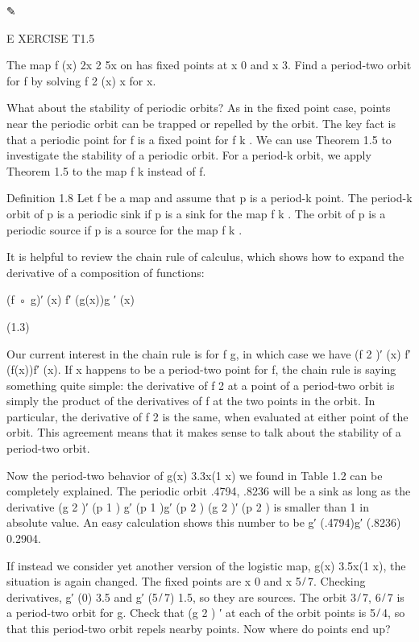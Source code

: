✎

E XERCISE T1.5

The map f (x)  2x 2  5x on has ﬁxed points at x  0 and x  3. Find a period-two orbit for f by solving f 2 
(x)  x for x.

What about the stability of periodic orbits? As in the ﬁxed point case, points near the periodic orbit can 
be trapped or repelled by the orbit. The key fact is that a periodic point for f is a ﬁxed point for f k . 
We can use Theorem 1.5 to investigate the stability of a periodic orbit. For a period-k orbit, we apply 
Theorem 1.5 to the map f k instead of f.


Deﬁnition 1.8 Let f be a map and assume that p is a period-k point. The period-k orbit of p is a periodic 
sink if p is a sink for the map f k . The orbit of p is a periodic source if p is a source for the map f k 
.

It is helpful to review the chain rule of calculus, which shows how to expand the derivative of a 
composition of functions:

(f ◦ g)′ (x)  f′ (g(x))g ′ (x)

(1.3)

Our current interest in the chain rule is for f  g, in which case we have (f 2 )′ (x)  f′ (f(x))f′ (x). If 
x happens to be a period-two point for f, the chain rule is saying something quite simple: the derivative 
of f 2 at a point of a period-two orbit is simply the product of the derivatives of f at the two points in 
the orbit. In particular, the derivative of f 2 is the same, when evaluated at either point of the orbit. 
This agreement means that it makes sense to talk about the stability of a period-two orbit.

Now the period-two behavior of g(x)  3.3x(1  x) we found in Table 1.2 can be completely explained. The 
periodic orbit .4794, .8236  will be a sink as long as the derivative (g 2 )′ (p 1 )  g′ (p 1 )g′ (p 2 )  
(g 2 )′ (p 2 ) is smaller than 1 in absolute value. An easy calculation shows this number to be g′ 
(.4794)g′ (.8236)  0.2904.

If instead we consider yet another version of the logistic map, g(x)  3.5x(1  x), the situation is again 
changed. The ﬁxed points are x  0 and x  5 ̸ 7. Checking derivatives, g′ (0)  3.5 and g′ (5 ̸ 7)  1.5, so 
they are sources. The orbit 3 ̸ 7, 6 ̸ 7  is a period-two orbit for g. Check that (g 2 ) ′ at each of the 
orbit points is 5 ̸ 4, so that this period-two orbit repels nearby points. Now where do points end up?

